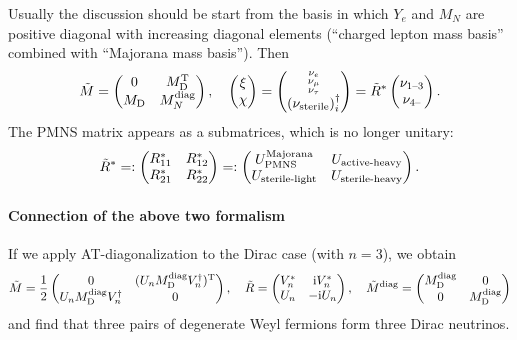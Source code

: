 \documentclass[CheatSheet]{subfiles}
\newcommand\MD[1][]{M_{\mathrm{D}#1}}
\newcommand\MN[1][]{M_{N#1}}
\begin{document}
Usually the discussion should be start from the basis in which $Y_e$ and $M_N$ are positive diagonal with increasing diagonal elements (``charged lepton mass basis'' combined with ``Majorana mass basis'').
Then
\begin{equation}
\tilde M = \pmat{0 & \MD^\TT \\ \MD & \MN\wdiag},
\quad
\pmat{\xi\\\chi}
=
\pmat{\begin{smallmatrix}\nu_e\\\nu_\mu\\\nu_\tau\end{smallmatrix}\\(\nu_{\text{sterile}})^\dagger_{i}}
=\tilde R^*\pmat{\nu_{1\TO3}\\\nu_{4\TO}}.
\end{equation}
The PMNS matrix appears as a submatrices, which is no longer unitary:
\begin{equation}
\tilde R^*
=:
\begin{pmatrix} R_{11}^* & R_{12}^* \\ R_{21}^* & R_{22}^*\end{pmatrix}
=:
\begin{pmatrix}U_{\mathrm{PMNS}}^{\text{Majorana}} & U_{\text{active-heavy}}\\
U_{\text{sterile-light}} & U_{\text{sterile-heavy}}
\end{pmatrix}.
\end{equation}


\paragraph{Connection of the above two formalism}
If we apply AT-diagonalization to the Dirac case (with $n=3$), we obtain
\begin{align}
\tilde M = \frac12\pmat{0 & (U_n\MD\wdiag V_n^\dagger)^\TT \\ U_n\MD\wdiag V_n^\dagger & 0},\quad
  \tilde R=\pmat{V_n^* & \ii V_n^* \\ U_n & -\ii U_n},\quad
  \tilde M\wdiag=\pmat{\MD\wdiag & 0 \\ 0 & \MD\wdiag}
\end{align}
and find that three pairs of degenerate Weyl fermions form three Dirac neutrinos. 
\end{document}
